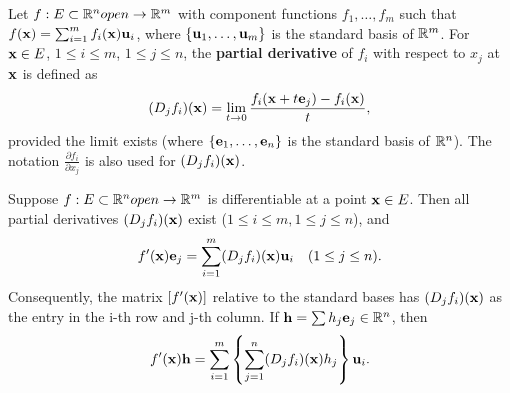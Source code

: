 \begin{definition}
  \label{def:chap9:partial_derivatives}
  Let $f: E \subset \mathbb{R}^n open \to \mathbb{R}^m$ with component functions
  $f_1, \dots, f_m$ such that $f(\mathbf{x}) = \sum_{i=1}^m
  f_i(\mathbf{x}) \mathbf{u}_i$, where $\{ \mathbf{u}_1, \dots, \mathbf{u}_m
  \}$ is the standard basis of $\mathbb{R}^m$. For $\mathbf{x} \in E$, $1 \le i
  \le m$, $1 \le j \le n$, the \textbf{partial derivative} of $f_i$
  with respect to $x_j$ at $\mathbf{x}$ is defined as
  \[
    (D_j f_i)(\mathbf{x}) = \lim_{t \to 0} \frac{f_i(\mathbf{x} +
    t\mathbf{e}_j) - f_i(\mathbf{x})}{t},
  \]
  provided the limit exists (where $\{ \mathbf{e}_1, \dots, \mathbf{e}_n
  \}$ is the standard basis of $\mathbb{R}^n$). The notation $\frac{\partial
  f_i}{\partial x_j}$ is also used for $(D_j f_i)(\mathbf{x})$.
\end{definition}

\begin{theorem}
  \label{thm:chap9:derivative_implies_partials}
  Suppose $f: E \subset \mathbb{R}^n open \to \mathbb{R}^m$ is differentiable at a
  point $\mathbf{x} \in E$. Then all partial derivatives $(D_j
  f_i)(\mathbf{x})$ exist ($1 \le i \le m, 1 \le j \le n$), and
  \begin{equation*} %
    f'(\vect{x})\vect{e}_j = \sum_{i=1}^m (D_j f_i)(\vect{x})
    \vect{u}_i \quad (1 \le j \le n).
  \end{equation*}
  Consequently, the matrix $[f'(\mathbf{x})]$ relative to the standard
  bases has $(D_j f_i)(\mathbf{x})$ as the entry in the i-th row and
  j-th column. If $\mathbf{h} = \sum h_j \mathbf{e}_j \in \mathbb{R}^n$, then
  \begin{equation*} %
    f'(\vect{x})\vect{h} = \sum_{i=1}^m \left\{ \sum_{j=1}^n (D_j
    f_i)(\vect{x}) h_j \right\} \vect{u}_i.
  \end{equation*}
\end{theorem}



